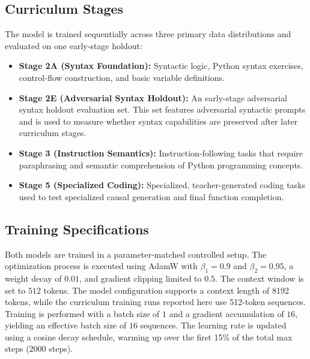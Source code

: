 \documentclass[11pt,a4paper]{article}
\begin{document}
\subsection{Curriculum Stages}
The model is trained sequentially across three primary data distributions and evaluated on one early-stage holdout:
\begin{itemize}
    \item \textbf{Stage 2A (Syntax Foundation):} Syntactic logic, Python syntax exercises, control-flow construction, and basic variable definitions.
    \item \textbf{Stage 2E (Adversarial Syntax Holdout):} An early-stage adversarial syntax holdout evaluation set. This set features adversarial syntactic prompts and is used to measure whether syntax capabilities are preserved after later curriculum stages.
    \item \textbf{Stage 3 (Instruction Semantics):} Instruction-following tasks that require paraphrasing and semantic comprehension of Python programming concepts.
    \item \textbf{Stage 5 (Specialized Coding):} Specialized, teacher-generated coding tasks used to test specialized causal generation and final function completion.
\end{itemize}

\subsection{Training Specifications}
Both models are trained in a parameter-matched controlled setup. The optimization process is executed using AdamW with $\beta_1 = 0.9$ and $\beta_2 = 0.95$, a weight decay of $0.01$, and gradient clipping limited to $0.5$. The context window is set to $512$ tokens. The model configuration supports a context length of 8192 tokens, while the curriculum training runs reported here use 512-token sequences. Training is performed with a batch size of $1$ and a gradient accumulation of $16$, yielding an effective batch size of $16$ sequences. The learning rate is updated using a cosine decay schedule, warming up over the first 15\% of the total max steps ($2000$ steps).
\end{document}
